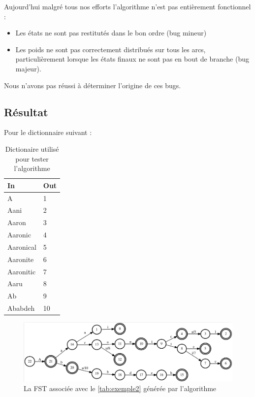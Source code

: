 Aujourd'hui malgré tous nos efforts l'algorithme n'est pas entièrement fonctionnel :
\begin{itemize}
    \item Les états ne sont pas restitutés dans le bon ordre (bug mineur)
    \item Les poids ne sont pas correctement distribués sur tous les arcs, particulièrement lorsque les états finaux ne sont pas en bout de branche (bug majeur).
\end{itemize}

Nous n'avons pas réussi à déterminer l'origine de ces bugs.

\subsection{Résultat}

Pour le dictionnaire suivant :

\begin{table}[h]
    \centering
    \begin{tabular}{|l|l|}
        \hline
        In & Out \\
        \hline
        A      &  1 \\
        Aani   &  2 \\
        Aaron  &  3 \\
        Aaronic&  4 \\
        Aaronical      &  5 \\
        Aaronite       &  6 \\
        Aaronitic      &  7 \\
        Aaru   &  8 \\
        Ab     &  9 \\
Ababdeh & 10 \\
        \hline
    \end{tabular}
    \caption{Dictionaire utilisé pour tester l'algorithme}
    \label{tab:exemple2}
\end{table}

\begin{figure}[ht]
    \centering
    \includegraphics[scale=0.35]{algofst.png}
    \caption{La FST associée avec le \autoref{tab:exemple2} générée par l'algorithme}
    \label{fig:algo:fstgen}
\end{figure}

